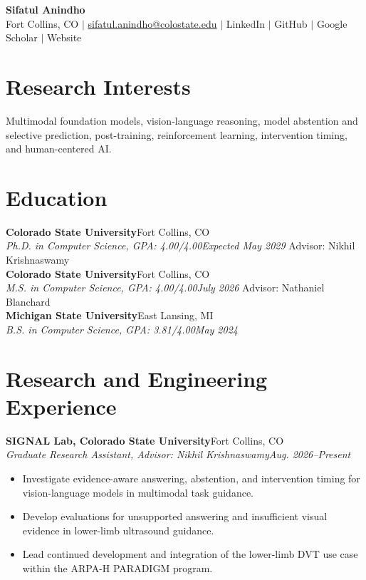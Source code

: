 \documentclass[9pt,letterpaper]{article}
\newcommand{\entry}[4]{\textbf{#1}\hfill #2\\\textit{#3}\hfill\textit{#4}\vspace{-3pt}}
\begin{document}
\begin{center}
{\LARGE\textbf{Sifatul Anindho}}\\[-1pt]
Fort Collins, CO $\mid$ \href{mailto:sifatul.anindho@colostate.edu}{sifatul.anindho@colostate.edu} $\mid$ LinkedIn $\mid$ GitHub $\mid$ Google Scholar $\mid$ Website
\end{center}
\vspace{-8pt}

\section{Research Interests}
Multimodal foundation models, vision-language reasoning, model abstention and selective prediction, post-training, reinforcement learning, intervention timing, and human-centered AI.

\section{Education}
\entry{Colorado State University}{Fort Collins, CO}{Ph.D. in Computer Science, GPA: 4.00/4.00}{Expected May 2029}
Advisor: Nikhil Krishnaswamy\\[-2pt]
\entry{Colorado State University}{Fort Collins, CO}{M.S. in Computer Science, GPA: 4.00/4.00}{July 2026}
Advisor: Nathaniel Blanchard\\[-2pt]
\entry{Michigan State University}{East Lansing, MI}{B.S. in Computer Science, GPA: 3.81/4.00}{May 2024}

\section{Research and Engineering Experience}
\entry{SIGNAL Lab, Colorado State University}{Fort Collins, CO}{Graduate Research Assistant, Advisor: Nikhil Krishnaswamy}{Aug. 2026--Present}
\begin{itemize}
\item Investigate evidence-aware answering, abstention, and intervention timing for vision-language models in multimodal task guidance.
\item Develop evaluations for unsupported answering and insufficient visual evidence in lower-limb ultrasound guidance.
\item Lead continued development and integration of the lower-limb DVT use case within the ARPA-H PARADIGM program.
\end{itemize}
\end{document}
